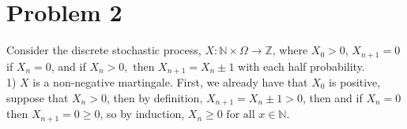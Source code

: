 \documentclass[12pt]{article}
\newcommand{\fall}[0] { \textrm{ for all } }
\newcommand{\then}[0] { \textrm{ then } }
\newcommand{\nats}[0] { \mathbb{N}}
\newcommand{\ints}[0] { \mathbb{Z}}
\newcommand{\Om}[0] { \Omega }
\newcommand{\rarw}[0] { \rightarrow }
\begin{document}
\section*{Problem 2}

Consider the discrete stochastic process, $X: \nats \times \Om \rarw \ints$, where $X_0 > 0$, $X_{n+1} = 0$ if $X_n=0$, and if $X_n>0, \then X_{n+1} = X_n \pm 1$ with each half probability.\\

1) $X$ is a non-negative martingale. First, we already have that $X_0$ is positive, suppose that $X_n > 0$, then by definition, $X_{n+1} = X_n \pm 1 > 0$, then and if $X_n = 0$ then $X_{n+1} = 0 \ge 0$, so by induction, $X_n \ge 0 \fall x\in \nats$. 


 
\end{document}
